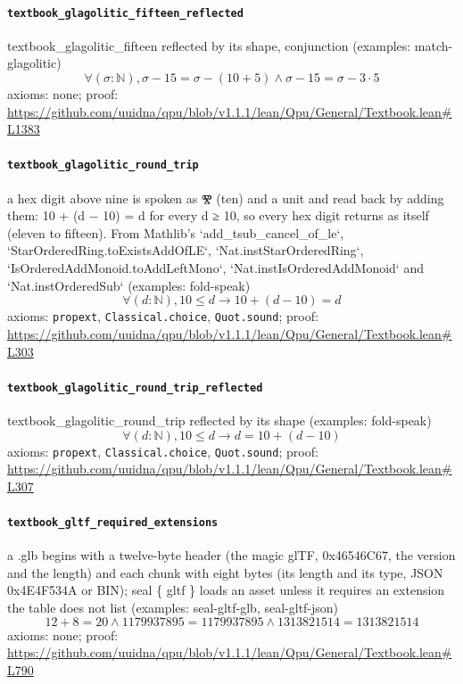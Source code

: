 \documentclass[11pt]{article}
\begin{document}
\paragraph{\texttt{textbook\_glagolitic\_fifteen\_reflected}}
textbook\_glagolitic\_fifteen reflected by its shape, conjunction (examples: match-glagolitic)
\[ \forall (\sigma : \mathbb{N}), \sigma - 15 = \sigma - (10 + 5) \land \sigma - 15 = \sigma - 3 \cdot 5 \]
\noindent axioms: none; proof: \url{https://github.com/uuidna/qpu/blob/v1.1.1/lean/Qpu/General/Textbook.lean\#L1383}

\paragraph{\texttt{textbook\_glagolitic\_round\_trip}}
a hex digit above nine is spoken as Ⰺ (ten) and a unit and read back by adding them: 10 + (d − 10) = d for every d ≥ 10, so every hex digit returns as itself (eleven to fifteen). From Mathlib's `add\_tsub\_cancel\_of\_le`, `StarOrderedRing.toExistsAddOfLE`, `Nat.instStarOrderedRing`, `IsOrderedAddMonoid.toAddLeftMono`, `Nat.instIsOrderedAddMonoid` and `Nat.instOrderedSub` (examples: fold-speak)
\[ \forall (d : \mathbb{N}), 10 \le d \to 10 + (d - 10) = d \]
\noindent axioms: \texttt{propext}, \texttt{Classical.choice}, \texttt{Quot.sound}; proof: \url{https://github.com/uuidna/qpu/blob/v1.1.1/lean/Qpu/General/Textbook.lean\#L303}

\paragraph{\texttt{textbook\_glagolitic\_round\_trip\_reflected}}
textbook\_glagolitic\_round\_trip reflected by its shape (examples: fold-speak)
\[ \forall (d : \mathbb{N}), 10 \le d \to d = 10 + (d - 10) \]
\noindent axioms: \texttt{propext}, \texttt{Classical.choice}, \texttt{Quot.sound}; proof: \url{https://github.com/uuidna/qpu/blob/v1.1.1/lean/Qpu/General/Textbook.lean\#L307}

\paragraph{\texttt{textbook\_gltf\_required\_extensions}}
a .glb begins with a twelve-byte header (the magic glTF, 0x46546C67, the version and the length) and each chunk with eight bytes (its length and its type, JSON 0x4E4F534A or BIN); seal \{ gltf \} loads an asset unless it requires an extension the table does not list (examples: seal-gltf-glb, seal-gltf-json)
\[ 12 + 8 = 20 \land 1179937895 = 1179937895 \land 1313821514 = 1313821514 \]
\noindent axioms: none; proof: \url{https://github.com/uuidna/qpu/blob/v1.1.1/lean/Qpu/General/Textbook.lean\#L790}
\end{document}
